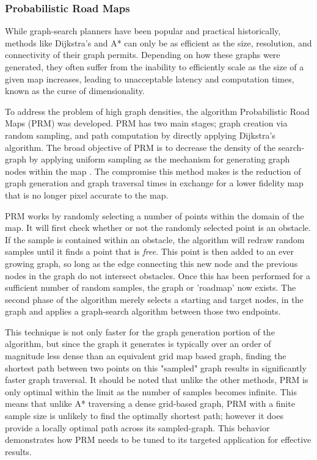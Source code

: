 \subsubsection{Probabilistic Road Maps}

While graph-search planners have been popular and practical historically, methods like Dijkstra's and A* can only be as efficient as the size, resolution, and connectivity of their graph permits. Depending on how these graphs were generated, they often suffer from the inability to efficiently scale as the size of a given map increases, leading to unacceptable latency and computation times, known as the curse of dimensionality.

To address the problem of high graph densities, the algorithm Probabilistic Road Maps (PRM) was developed. PRM has two main stages; graph creation via random sampling, and path computation by directly applying Dijkstra's algorithm. The broad objective of PRM is to decrease the density of the search-graph by applying uniform sampling as the mechanism for generating graph nodes within the map \cite{PRM}. The compromise this method makes is the reduction of graph generation and graph traversal times in exchange for a lower fidelity map that is no longer pixel accurate to the map.

PRM works by randomly selecting a number of points within the domain of the map. It will first check whether or not the randomly selected point is an obstacle. If the sample is contained within an obstacle, the algorithm will redraw random samples until it finds a point that is \textit{free}. This point is then added to an ever growing graph, so long as the edge connecting this new node and the previous nodes in the graph do not intersect obstacles. Once this has been performed for a sufficient number of random samples, the graph or 'roadmap' now exists. The second phase of the algorithm merely selects a starting and target nodes, in the graph and applies a graph-search algorithm between those two endpoints.

This technique is not only faster for the graph generation portion of the algorithm, but since the graph it generates is typically over an order of magnitude less dense than an equivalent grid map based graph, finding the shortest path between two points on this "sampled" graph results in significantly faster graph traversal. It should be noted that unlike the other methods, PRM is only optimal within the limit as the number of samples becomes infinite. This means that unlike A* traversing a dense grid-based graph, PRM with a finite sample size is unlikely to find the optimally shortest path; however it does provide a locally optimal path across its sampled-graph. This behavior demonstrates how PRM needs to be tuned to its targeted application for effective results.  

